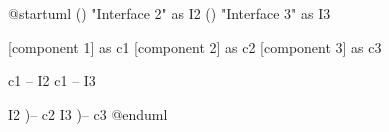 \documentclass{scrartcl}
\begin{document}
\begin{plant-uml}
@startuml
() "Interface 2" as I2
() "Interface 3" as I3

[component 1] as c1
[component 2] as c2
[component 3] as c3

c1 -- I2
c1 -- I3

I2 )-- c2
I3 )-- c3
@enduml
\end{plant-uml}
\end{document}
